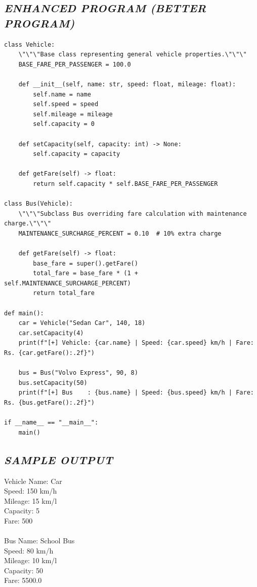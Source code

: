 \documentclass[11pt,a4paper]{article}
\begin{document}
\subsection*{\textit{ENHANCED PROGRAM (BETTER PROGRAM)}}
\begin{lstlisting}[style=pythonstyle]
class Vehicle:
    \"\"\"Base class representing general vehicle properties.\"\"\"
    BASE_FARE_PER_PASSENGER = 100.0

    def __init__(self, name: str, speed: float, mileage: float):
        self.name = name
        self.speed = speed
        self.mileage = mileage
        self.capacity = 0

    def setCapacity(self, capacity: int) -> None:
        self.capacity = capacity

    def getFare(self) -> float:
        return self.capacity * self.BASE_FARE_PER_PASSENGER

class Bus(Vehicle):
    \"\"\"Subclass Bus overriding fare calculation with maintenance charge.\"\"\"
    MAINTENANCE_SURCHARGE_PERCENT = 0.10  # 10% extra charge

    def getFare(self) -> float:
        base_fare = super().getFare()
        total_fare = base_fare * (1 + self.MAINTENANCE_SURCHARGE_PERCENT)
        return total_fare

def main():
    car = Vehicle("Sedan Car", 140, 18)
    car.setCapacity(4)
    print(f"[+] Vehicle: {car.name} | Speed: {car.speed} km/h | Fare: Rs. {car.getFare():.2f}")

    bus = Bus("Volvo Express", 90, 8)
    bus.setCapacity(50)
    print(f"[+] Bus    : {bus.name} | Speed: {bus.speed} km/h | Fare: Rs. {bus.getFare():.2f}")

if __name__ == "__main__":
    main()
\end{lstlisting}

\subsection*{\textit{SAMPLE OUTPUT}}
\begin{tcolorbox}[colback=black!85,colframe=navyblue,title=\textbf{Terminal Output},coltitle=white,fonttitle=\bfseries\small]
\small\ttfamily\color{green!30!white}
Vehicle Name: Car\\
Speed: 150 km/h\\
Mileage: 15 km/l\\
Capacity: 5\\
Fare: 500\\
\\
Bus Name: School Bus\\
Speed: 80 km/h\\
Mileage: 10 km/l\\
Capacity: 50\\
Fare: 5500.0
\end{tcolorbox}
\end{document}
